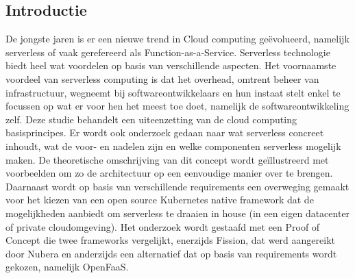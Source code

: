 \documentclass[a0,portrait]{a0poster}
\begin{document}
\begin{multicols}{2}
\section*{Introductie}
\color{black}
\color{black}
De jongste jaren is er een nieuwe trend in Cloud computing geëvolueerd, namelijk serverless of vaak gerefereerd als Function-as-a-Service. Serverless technologie biedt heel wat voordelen op basis van verschillende aspecten. Het voornaamste voordeel van serverless computing is dat het overhead, omtrent beheer van infrastructuur, wegneemt bij softwareontwikkelaars en hun instaat stelt enkel te focussen op wat er voor hen het meest toe doet, namelijk de softwareontwikkeling zelf.
Deze studie behandelt een uiteenzetting van de cloud computing basisprincipes. Er wordt ook onderzoek gedaan naar wat serverless concreet inhoudt, wat de voor- en nadelen zijn en welke componenten serverless mogelijk maken. De theoretische omschrijving van dit concept wordt geïllustreerd met voorbeelden om zo de architectuur op een eenvoudige manier over te brengen. Daarnaast wordt op basis van verschillende requirements een overweging gemaakt voor het kiezen van een open source Kubernetes native framework dat de mogelijkheden aanbiedt om serverless te draaien in house (in een eigen datacenter of private cloudomgeving). Het onderzoek wordt gestaafd met een Proof of Concept die twee frameworks vergelijkt, enerzijds Fission, dat werd aangereikt door Nubera en anderzijds een alternatief dat op basis van requirements wordt gekozen, namelijk OpenFaaS. 

\color{Black} %
\color{HoGentAccent1} 

\end{multicols}
\end{document}
